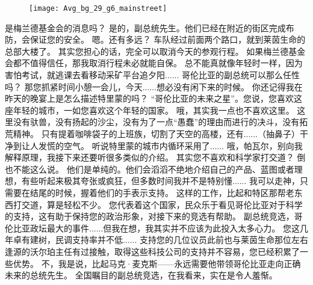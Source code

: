 \documentclass[openany]{book}
\begin{document}
\begin{figure}[h]
    \centering
    \texttt{[image: Avg\_bg\_29\_g6\_mainstreet]}
\end{figure}
\begin{dialogue}
     是梅兰德基金会的消息吗？
     是的，副总统先生。他们已经在附近的街区完成布防，会保证您的安全。
     嗯。还有多远？
     车队经过前面两个路口，就到莱茵生命的总部大楼了。
     其实您担心的话，完全可以取消今天的参观行程。
     如果梅兰德基金会都不值得信任，那我取消行程未必就能自保。
     总不能真就像年轻时一样，因为害怕考试，就逃课去看移动采矿平台追夕阳......
     哥伦比亚的副总统可以那么任性吗？
     那您抓紧时间小憩一会儿，今天......想必没有闲下来的时候。
     你还记得我在昨天的晚宴上是怎么描述特里蒙的吗？
     “哥伦比亚的未来之星”。您说，您喜欢这座年轻的城市，一如您喜欢这个年轻的国家。
     哦，其实我一点也不喜欢这里。
     这里没有驮兽，没有扬起的沙尘，没有为了一点“愚蠢”的理由而进行的决斗，没有拓荒精神。
     只有提着咖啡袋子的上班族，切割了天空的高楼，还有......（抽鼻子）干净到让人发慌的空气。
     听说特里蒙的城市内循环采用了......
     哦，帕瓦尔，别向我解释原理，我接下来还要听很多类似的介绍。
     其实您不喜欢和科学家打交道？
     倒也不能这么说。
     他们是单纯的。他们会滔滔不绝地介绍自己的产品、蓝图或者理想，有些听起来极其夸张或疯狂，但多数时间我并不是特别懂......
     我可以走神，只需要在结尾的时候，握着他们的手表示支持。
     这样的工作，比起和特区那帮老东西打交道，算是轻松不少。
     您代表着这个国家，民众乐于看见哥伦比亚对于科学的支持，这有助于保持您的政治形象，对接下来的竞选有帮助。
     副总统竞选，哥伦比亚政坛最大的事件......但我在想，我其实并不应该为此投入太多心力。
     您这几年卓有建树，民调支持率并不低......
     支持您的几位议员此前也与莱茵生命那位左右逢源的沃尔珀主任有过接触，取得这些科技公司的支持并不容易，您已经积累了一些优势。
     不，我是说，比起马克·麦克斯——永远需要他带领哥伦比亚走向正确未来的总统先生。
     全国瞩目的副总统竞选，在我看来，实在是令人羞惭。
\end{dialogue}
\end{document}
